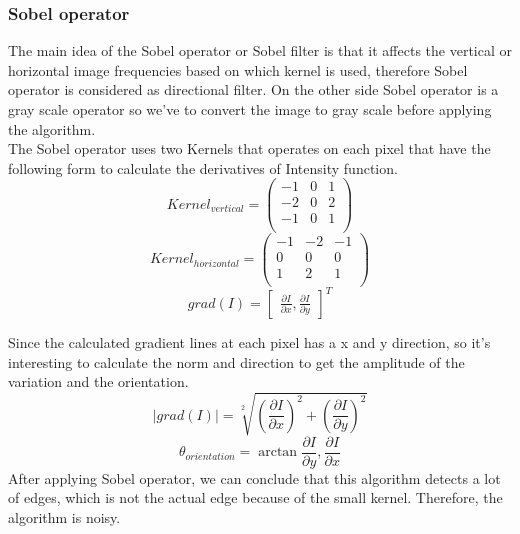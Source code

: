 \documentclass[journal,final,a4paper,twoside]{PS}
\begin{document}
\subsubsection{Sobel operator}
The main idea of the Sobel operator or Sobel filter is that it affects the vertical or horizontal image frequencies based on which kernel is used, therefore Sobel operator is considered as directional filter. On the other side Sobel operator is a gray scale operator so we've to convert the image to gray scale before applying the algorithm\cite{Langaniere}.
\\
The Sobel operator uses two Kernels that operates on each pixel that have the following form to calculate the derivatives of Intensity function\cite{Langaniere}.
\begin{equation}
Kernel_{vertical}=\begin{pmatrix}
-1&0&1\\
-2&0&2\\
-1&0&1\\
\end{pmatrix}
\end{equation}
\begin{equation}
Kernel_{horizontal}=\begin{pmatrix}
-1&-2&-1\\
0&0&0\\
1&2&1\\
\end{pmatrix}
\end{equation}
\begin{equation}
grad(I)=\begin{bmatrix}
\frac{\partial I}{\partial x},\frac{\partial I}{\partial y}
\end{bmatrix}^T
\end{equation}


Since the calculated gradient lines at each pixel has a x and y direction, so it's interesting to calculate the norm and direction to get the amplitude of the variation and the orientation.
\begin{equation}
|grad(I)|=\sqrt[2]{\left(\frac{\partial I}{\partial x}\right)^2+\left(\frac{\partial I}{\partial y}\right)^2}
\end{equation}
\begin{equation}
\theta_{orientation}=\arctan{\frac{\partial I}{\partial y},\frac{\partial I}{\partial x}}
\end{equation}
After applying Sobel operator, we can conclude that this algorithm detects a lot of edges, which is not the actual edge because of the small kernel. Therefore, the algorithm is noisy. 
\end{document}
